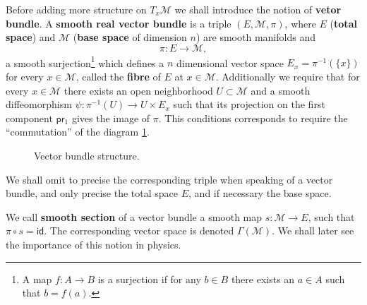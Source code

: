 \documentclass[10pt]{book}
\newcommand{\id}{\mathsf{id}}
\newcommand{\Mcal}{\mathcal{M}}
\newcommand{\psf}{\mathsf{p}}
\newcommand{\rsf}{\mathsf{r}}
\theoremstyle{break}
\begin{document}
Before adding more structure on $T_x \Mcal$ we shall introduce the notion of \textbf{vetor bundle}. A \textbf{smooth real vector bundle} is a triple $(E,\Mcal,\pi)$, where $E$ (\textbf{total space}) and $\Mcal$ (\textbf{base space} of dimension $n$) are smooth manifolds and 
%
\begin{equation*}
\pi : E \to \Mcal , 
\end{equation*}
%
a smooth surjection\footnote{A map $f : A \to B$ is a surjection if for any $b \in B$ there exists an $a\in A$ such that $b=f(a)$.} which defines a $n$ dimensional vector space $E_x = \pi^{-1}(\{x\})$ for every $x \in \Mcal$, called the \textbf{fibre} of $E$ at $x\in\Mcal$. Additionally we require that for every $x\in\Mcal$ there exists an open neighborhood $U \subset \Mcal$ and a smooth diffeomorphism $\psi : \pi^{-1}(U) \to U \times E_x$ such that its projection on the first component $\psf\rsf_1$ gives the image of $\pi$. This conditions corresponds to require the ``commutation'' of the diagram \ref{fig:vect_bund_strut}.


\begin{figure}[h!]
\begin{center}
\end{center}
\caption{Vector bundle structure.}
\label{fig:vect_bund_strut}
\end{figure}


We shall omit to precise the corresponding triple when speaking of a vector bundle, and only precise the total space $E$, and if necessary the base space.


\bigskip


We call \textbf{smooth section} of a vector bundle a smooth map $s : \Mcal \to E$, such that $\pi \circ s = \id$. The corresponding vector space is denoted $\Gamma(\Mcal)$. We shall later see the importance of this notion in physics.
\end{document}
